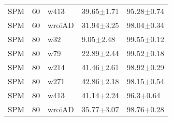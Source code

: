 \begin{table}[ht]
\begin{center}
\begin{tabular}{lllll}
  SPM & 60 & w413 & 39.65$\pm$1.71 & 95.28$\pm$0.74 \\ 
  SPM & 60 & wroiAD & 31.94$\pm$3.25 & 98.04$\pm$0.34 \\ 
  SPM & 80 & w32 & 9.05$\pm$2.48 & 99.55$\pm$0.12 \\ 
  SPM & 80 & w79 & 22.89$\pm$2.44 & 99.52$\pm$0.18 \\ 
  SPM & 80 & w214 & 41.46$\pm$2.61 & 98.92$\pm$0.29 \\ 
  SPM & 80 & w271 & 42.86$\pm$2.18 & 98.15$\pm$0.54 \\ 
  SPM & 80 & w413 & 41.14$\pm$2.24 & 96.3$\pm$0.64 \\ 
  SPM & 80 & wroiAD & 35.77$\pm$3.07 & 98.76$\pm$0.28 \\ 
   \hline
\end{tabular}
\end{center}
\end{table}
